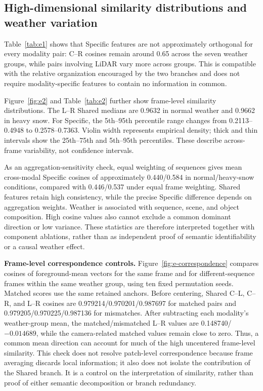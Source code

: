 \subsection{High-dimensional similarity distributions and weather variation}
\label{subsec:e2}

Table~\ref{tab:e1} shows that Specific features are not approximately orthogonal for every modality pair: C--R cosines remain around 0.65 across the seven weather groups, while pairs involving LiDAR vary more across groups. This is compatible with the relative organization encouraged by the two branches and does not require modality-specific features to contain no information in common.

Figure~\ref{fig:e2} and Table~\ref{tab:e2} further show frame-level similarity distributions. The L--R Shared medians are 0.9632 in normal weather and 0.9662 in heavy snow. For Specific, the 5th--95th percentile range changes from 0.2113--0.4948 to 0.2578--0.7363. Violin width represents empirical density; thick and thin intervals show the 25th--75th and 5th--95th percentiles. These describe across-frame variability, not confidence intervals.

As an aggregation-sensitivity check, equal weighting of sequences gives mean cross-modal Specific cosines of approximately 0.440/0.584 in normal/heavy-snow conditions, compared with 0.446/0.537 under equal frame weighting. Shared features retain high consistency, while the precise Specific difference depends on aggregation weights. Weather is associated with sequence, scene, and object composition. High cosine values also cannot exclude a common dominant direction or low variance. These statistics are therefore interpreted together with component ablations, rather than as independent proof of semantic identifiability or a causal weather effect.

\textbf{Frame-level correspondence controls.} Figure~\ref{fig:e-correspondence} compares cosines of foreground-mean vectors for the same frame and for different-sequence frames within the same weather group, using ten fixed permutation seeds. Matched scores use the same retained anchors. Before centering, Shared C--L, C--R, and L--R cosines are 0.979214/0.970201/0.987697 for matched pairs and 0.979205/0.970225/0.987136 for mismatches. After subtracting each modality's weather-group mean, the matched/mismatched L--R values are 0.148740/\(-0.014689\), while the camera-related matched values remain close to zero. Thus, a common mean direction can account for much of the high uncentered frame-level similarity. This check does not resolve patch-level correspondence because frame averaging discards local information; it also does not isolate the contribution of the Shared branch. It is a control on the interpretation of similarity, rather than proof of either semantic decomposition or branch redundancy.

